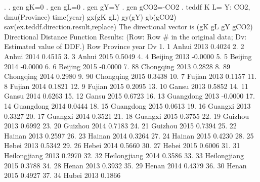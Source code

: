 . 
. gen gK=0
{\smallskip}
. gen gL=0
{\smallskip}
. gen gY=Y
{\smallskip}
. gen gCO2=-CO2
{\smallskip}
. teddf K L= Y: CO2, dmu(Province) time(year) gx(gK gL) gy(gY) gb(gCO2) sav(ex.teddf.direction.result,replace)
{\smallskip}
 The directional vector is (gK gL gY gCO2)
{\smallskip}
{\smallskip}
  Directional Distance Function Results:
    (Row: Row \# in the original data; Dv: Estimated value of  DDF.)
{\smallskip}
     {\TLC}
     {\VBAR} Row       Province   year        Dv {\VBAR}
     {\LFTT}
  1. {\VBAR}   1          Anhui   2013    0.4024 {\VBAR}
  2. {\VBAR}   2          Anhui   2014    0.4515 {\VBAR}
  3. {\VBAR}   3          Anhui   2015    0.5049 {\VBAR}
  4. {\VBAR}   4        Beijing   2013   -0.0000 {\VBAR}
  5. {\VBAR}   5        Beijing   2014   -0.0000 {\VBAR}
  6. {\VBAR}   6        Beijing   2015   -0.0000 {\VBAR}
  7. {\VBAR}  88      Chongqing   2013    0.2828 {\VBAR}
  8. {\VBAR}  89      Chongqing   2014    0.2980 {\VBAR}
  9. {\VBAR}  90      Chongqing   2015    0.3438 {\VBAR}
 10. {\VBAR}   7         Fujian   2013    0.1157 {\VBAR}
 11. {\VBAR}   8         Fujian   2014    0.1821 {\VBAR}
 12. {\VBAR}   9         Fujian   2015    0.2095 {\VBAR}
 13. {\VBAR}  10          Gansu   2013    0.5852 {\VBAR}
 14. {\VBAR}  11          Gansu   2014    0.6263 {\VBAR}
 15. {\VBAR}  12          Gansu   2015    0.6723 {\VBAR}
 16. {\VBAR}  13      Guangdong   2013   -0.0000 {\VBAR}
 17. {\VBAR}  14      Guangdong   2014    0.0444 {\VBAR}
 18. {\VBAR}  15      Guangdong   2015    0.0613 {\VBAR}
 19. {\VBAR}  16        Guangxi   2013    0.3327 {\VBAR}
 20. {\VBAR}  17        Guangxi   2014    0.3521 {\VBAR}
 21. {\VBAR}  18        Guangxi   2015    0.3755 {\VBAR}
 22. {\VBAR}  19        Guizhou   2013    0.6992 {\VBAR}
 23. {\VBAR}  20        Guizhou   2014    0.7183 {\VBAR}
 24. {\VBAR}  21        Guizhou   2015    0.7394 {\VBAR}
 25. {\VBAR}  22         Hainan   2013    0.2597 {\VBAR}
 26. {\VBAR}  23         Hainan   2014    0.3264 {\VBAR}
 27. {\VBAR}  24         Hainan   2015    0.4230 {\VBAR}
 28. {\VBAR}  25          Hebei   2013    0.5342 {\VBAR}
 29. {\VBAR}  26          Hebei   2014    0.5660 {\VBAR}
 30. {\VBAR}  27          Hebei   2015    0.6006 {\VBAR}
 31. {\VBAR}  31   Heilongjiang   2013    0.2970 {\VBAR}
 32. {\VBAR}  32   Heilongjiang   2014    0.3586 {\VBAR}
 33. {\VBAR}  33   Heilongjiang   2015    0.3788 {\VBAR}
 34. {\VBAR}  28          Henan   2013    0.3932 {\VBAR}
 35. {\VBAR}  29          Henan   2014    0.4379 {\VBAR}
 36. {\VBAR}  30          Henan   2015    0.4927 {\VBAR}
 37. {\VBAR}  34          Hubei   2013    0.1866 {\VBAR}
